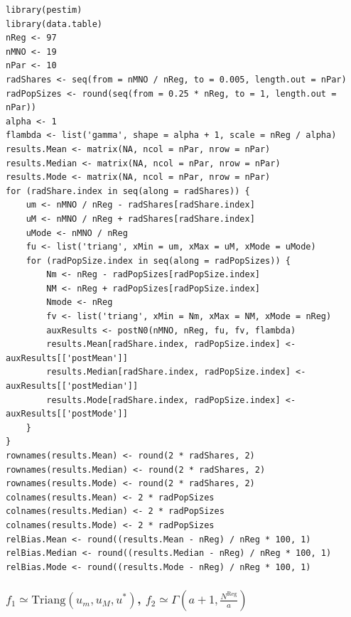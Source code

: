 \documentclass[12pt, a4paper]{article}
\begin{document}
\begin{verbatim}
library(pestim)
library(data.table)
nReg <- 97
nMNO <- 19
nPar <- 10
radShares <- seq(from = nMNO / nReg, to = 0.005, length.out = nPar)
radPopSizes <- round(seq(from = 0.25 * nReg, to = 1, length.out = nPar))
alpha <- 1
flambda <- list('gamma', shape = alpha + 1, scale = nReg / alpha)
results.Mean <- matrix(NA, ncol = nPar, nrow = nPar)
results.Median <- matrix(NA, ncol = nPar, nrow = nPar)
results.Mode <- matrix(NA, ncol = nPar, nrow = nPar)
for (radShare.index in seq(along = radShares)) {
    um <- nMNO / nReg - radShares[radShare.index]
    uM <- nMNO / nReg + radShares[radShare.index]
    uMode <- nMNO / nReg
    fu <- list('triang', xMin = um, xMax = uM, xMode = uMode)
    for (radPopSize.index in seq(along = radPopSizes)) {
        Nm <- nReg - radPopSizes[radPopSize.index]
        NM <- nReg + radPopSizes[radPopSize.index]
        Nmode <- nReg
        fv <- list('triang', xMin = Nm, xMax = NM, xMode = nReg)
        auxResults <- postN0(nMNO, nReg, fu, fv, flambda)
        results.Mean[radShare.index, radPopSize.index] <- auxResults[['postMean']] 
        results.Median[radShare.index, radPopSize.index] <- auxResults[['postMedian']]
        results.Mode[radShare.index, radPopSize.index] <- auxResults[['postMode']]
    }
}
rownames(results.Mean) <- round(2 * radShares, 2)
rownames(results.Median) <- round(2 * radShares, 2)
rownames(results.Mode) <- round(2 * radShares, 2)
colnames(results.Mean) <- 2 * radPopSizes
colnames(results.Median) <- 2 * radPopSizes
colnames(results.Mode) <- 2 * radPopSizes
relBias.Mean <- round((results.Mean - nReg) / nReg * 100, 1)
relBias.Median <- round((results.Median - nReg) / nReg * 100, 1)
relBias.Mode <- round((results.Mode - nReg) / nReg * 100, 1)
\end{verbatim}

\subsubsection{$f_{1}\simeq\textrm{Triang}(u_{m}, u_{M}, u^{*})$, $f_{2}\simeq\Gamma(a + 1, \frac{N^{\textrm{Reg}}}{a})$}
\end{document}
